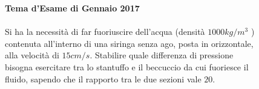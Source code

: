 \begin{figure}[h!]
    \textbf{Tema d'Esame di Gennaio 2017}\\ \\
    Si ha la necessità di far fuoriuscire dell'acqua (densità $1000 kg/m^3$
    ) contenuta all'interno di una siringa senza ago, posta in orizzontale, alla velocità di $15 cm/s$.
     Stabilire quale differenza di pressione bisogna esercitare tra lo stantuffo e il beccuccio da cui fuoriesce il
    fluido, sapendo che il rapporto tra le due sezioni vale $20$. 
\end{figure}
